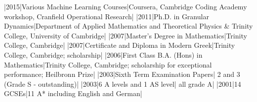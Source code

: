 \documentclass[a4paper,10pt]{article}
\begin{document}
  

\begin{cvsection}[Education]
|2015|Various Machine Learning Courses|Coursera, Cambridge Coding Academy workshop, Cranfield Operational Research|
|2011|Ph.D. in Granular Dynamics|Department of Applied Mathematics and Theoretical Physics \& Trinity College, University of Cambridge|
|2007|Master's Degree in Mathematics|Trinity College, Cambridge|
|2007|Certificate and Diploma in Modern Greek|Trinity College, Cambridge;
scholarship|
|2006|First Class B.A. (Hons) in Mathematics|Trinity College, Cambridge;
scholarship for exceptional performance; Heilbronn Prize|
|2003|Sixth Term Examination Papers| 2 and 3 (Grade S - outstanding)|
|2003|6 A levels and 1 AS level| all grade A|
|2001|14 GCSEs|11 A* including English and German|
\end{cvsection}

\end{document}
